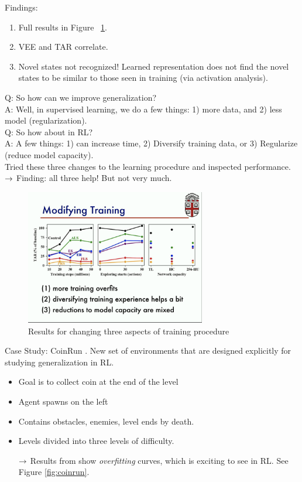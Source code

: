 Findings:
\begin{enumerate}
    \item Full results in Figure ~\ref{fig:gen}.
    \item VEE and TAR correlate.
    \item Novel states not recognized! Learned representation does not find the novel states to be similar to those seen in training (via activation analysis).
\end{enumerate}


Q: So how can we improve generalization? \\

A: Well, in supervised learning, we do a few things: 1) more data, and 2) less model (regularization). \\

Q: So how about in RL? \\

A: A few things: 1) can increase time, 2) Diversify training data, or 3) Regularize (reduce model capacity). \\

Tried these three changes to the learning procedure and inspected performance. \\

$\rightarrow$ Finding: all three help! But not very much. \\

\begin{figure}[h!]
    \centering
    \includegraphics[width=0.7\textwidth]{figures/mod_train.png}
    \caption{Results for changing three aspects of training procedure}
    \label{fig:gen}
\end{figure}

Case Study: CoinRun \cite{cobbe2018quantifying}. New set of environments that are designed explicitly for studying generalization in RL.
\begin{itemize}
    \item Goal is to collect coin at the end of the level
    \item Agent spawns on the left
    \item Contains obstacles, enemies, level ends by death.
    \item Levels divided into three levels of difficulty.
    
    $\rightarrow$ Results from \citet{cobbe2018quantifying} show {\it overfitting} curves, which is exciting to see in RL. See Figure \ref{fig:coinrun}.
\end{itemize}


